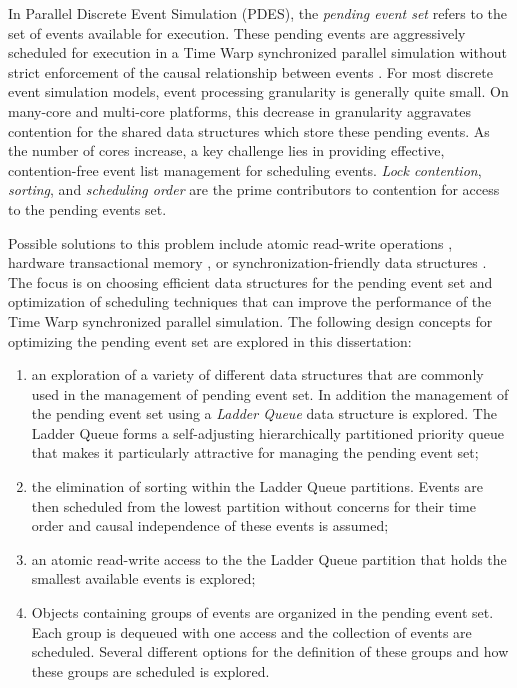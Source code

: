 \documentclass[11pt]{book}
\begin{document}
In Parallel Discrete Event Simulation (PDES), the \emph{pending event set} refers to the set of events
available for execution.  These pending events are aggressively scheduled for execution in a Time Warp
synchronized parallel simulation without strict enforcement of the causal relationship between events
\cite{fujimoto-00,jefferson-85}.  For most discrete event simulation models, event processing granularity is
generally quite small.  On many-core and multi-core platforms, this decrease in granularity aggravates
contention for the shared data structures which store these pending events.  As the number of cores increase,
a key challenge lies in providing effective, contention-free event list management for scheduling events.
\emph{Lock contention}, \emph{sorting}, and \emph{scheduling order} are the prime contributors to contention
for access to the pending events set.

Possible solutions to this problem include atomic read-write operations \cite{gupta-14}, hardware
transactional memory \cite{hay-15,santini-15}, or synchronization-friendly data structures
\cite{dickman-13,gupta-17}.  The focus is on choosing efficient data structures for the pending event set and
optimization of scheduling techniques that can improve the performance of the Time Warp synchronized parallel
simulation.  The following design concepts for optimizing the pending event set are explored in this
dissertation: 

\begin{enumerate}

\item an exploration of a variety of different data structures that are commonly used in the management of
  pending event set.  In addition the management of the pending event set using a \emph{Ladder
    Queue}\cite{tang-05} data structure is explored.  The Ladder Queue forms a self-adjusting hierarchically
  partitioned priority queue that makes it particularly attractive for managing the pending event set; 

\item the elimination of sorting within the Ladder Queue partitions.  Events are then scheduled from the
  lowest partition without concerns for their time order and causal independence of these events is assumed;

\item an atomic read-write access to the the Ladder Queue partition that holds the smallest available events
  is explored;

\item Objects containing groups of events are organized in the pending event set.  Each group is dequeued
  with one access and the collection of events are scheduled.  Several different options for the definition
  of these groups and how these groups are scheduled is explored. 

\end{enumerate}
\end{document}

